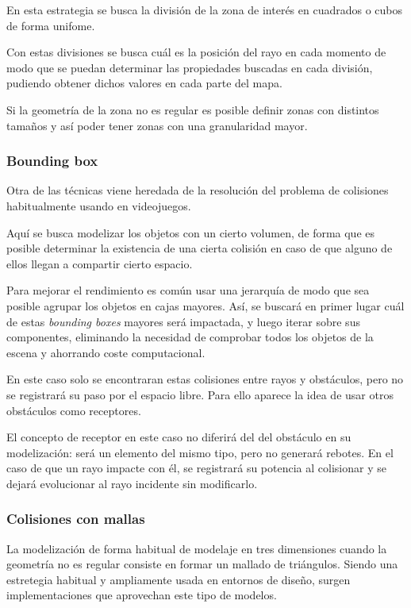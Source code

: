 En esta estrategia se busca la división de la zona de interés en cuadrados o cubos de forma unifome.

Con estas divisiones se busca cuál es la posición del rayo en cada momento de modo que se puedan determinar las propiedades buscadas en cada división, pudiendo obtener dichos valores en cada parte del mapa.

Si la geometría de la zona no es regular es posible definir zonas con distintos tamaños y así poder tener zonas con una granularidad mayor.

\subsubsection*{Bounding box}

Otra de las técnicas viene heredada de la resolución del problema de colisiones habitualmente usando en videojuegos.

Aquí se busca modelizar los objetos con un cierto volumen, de forma que es posible determinar la existencia de una cierta colisión en caso de que alguno de ellos llegan a compartir cierto espacio.

Para mejorar el rendimiento es común usar una jerarquía de modo que sea posible agrupar los objetos en cajas mayores.
Así, se buscará en primer lugar cuál de estas \textit{bounding boxes} mayores será impactada, y luego iterar sobre sus componentes, eliminando la necesidad de comprobar todos los objetos de la escena y ahorrando coste computacional.

En este caso solo se encontraran estas colisiones entre rayos y obstáculos, pero no se registrará su paso por el espacio libre.
Para ello aparece la idea de usar otros obstáculos como receptores.

El concepto de receptor en este caso no diferirá del del obstáculo en su modelización: será un elemento del mismo tipo, pero no generará rebotes.
En el caso de que un rayo impacte con él, se registrará su potencia al colisionar y se dejará evolucionar al rayo incidente sin modificarlo.

\subsubsection*{Colisiones con mallas}

La modelización de forma habitual de modelaje en tres dimensiones cuando la geometría no es regular consiste en formar un mallado de triángulos.
Siendo una estretegia habitual y ampliamente usada en entornos de diseño, surgen implementaciones que aprovechan este tipo de modelos.

